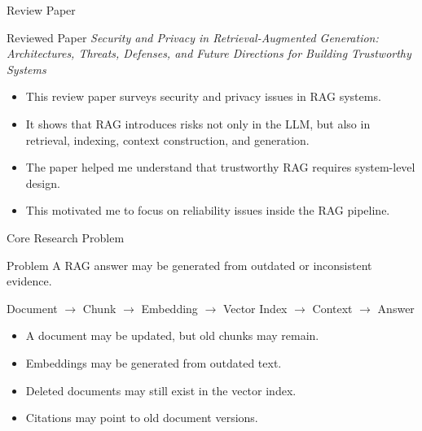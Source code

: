 \documentclass[aspectratio=169]{beamer}
\begin{document}
\begin{frame}{Review Paper}
  \begin{block}{Reviewed Paper}
    \textit{Security and Privacy in Retrieval-Augmented Generation: Architectures, Threats, Defenses, and Future Directions for Building Trustworthy Systems}
  \end{block}

  \begin{itemize}
    \item This review paper surveys security and privacy issues in RAG systems.
    \item It shows that RAG introduces risks not only in the LLM, but also in retrieval, indexing, context construction, and generation.
    \item The paper helped me understand that trustworthy RAG requires system-level design.
    \item This motivated me to focus on reliability issues inside the RAG pipeline.
  \end{itemize}
\end{frame}

\begin{frame}{Core Research Problem}
  \begin{block}{Problem}
    A RAG answer may be generated from outdated or inconsistent evidence.
  \end{block}

  \begin{center}
    \Large
    Document $\rightarrow$ Chunk $\rightarrow$ Embedding $\rightarrow$ Vector Index $\rightarrow$ Context $\rightarrow$ Answer
  \end{center}

  \vspace{0.8em}

  \begin{itemize}
    \item A document may be updated, but old chunks may remain.
    \item Embeddings may be generated from outdated text.
    \item Deleted documents may still exist in the vector index.
    \item Citations may point to old document versions.
  \end{itemize}
\end{frame}
\end{document}
